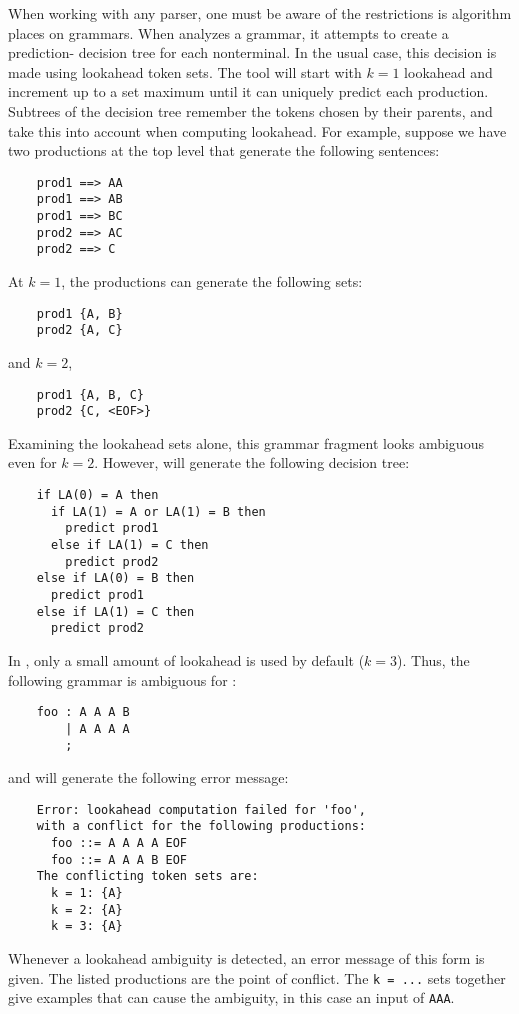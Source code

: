 When working with any parser, one must be aware of the restrictions is algorithm places on grammars.
When \antlr{} analyzes a grammar, it attempts to create a prediction-
decision tree for each nonterminal.  In the usual case, this decision
is made using lookahead token sets.  The tool will start with $k = 1$
lookahead and increment up to a set maximum until it can
uniquely predict each production.  Subtrees of the decision tree
remember the tokens chosen by their parents, and take this into account
when computing lookahead.  For example, suppose we have two productions
at the top level that generate the following sentences:
\begin{verbatim}
    prod1 ==> AA
    prod1 ==> AB
    prod1 ==> BC
    prod2 ==> AC
    prod2 ==> C
\end{verbatim}
At $k = 1$, the productions can generate the following sets:
\begin{verbatim}
    prod1 {A, B}
    prod2 {A, C}
\end{verbatim}
and $k = 2$,
\begin{verbatim}
    prod1 {A, B, C}
    prod2 {C, <EOF>}
\end{verbatim}
Examining the lookahead sets alone, this grammar fragment looks ambiguous
even for $k = 2$.  However, \antlr{} will generate the following decision
tree:
\begin{verbatim}
    if LA(0) = A then
      if LA(1) = A or LA(1) = B then
        predict prod1
      else if LA(1) = C then
        predict prod2
    else if LA(0) = B then
      predict prod1
    else if LA(1) = C then
      predict prod2
\end{verbatim}

In \antlr{}, only a small amount of lookahead is used by default ($k = 3$).  Thus, the following grammar is ambiguous for \antlr{}:
\begin{verbatim}
    foo : A A A B
        | A A A A
        ;
\end{verbatim}
and will generate the following error message:
\begin{verbatim}
    Error: lookahead computation failed for 'foo',
    with a conflict for the following productions:
      foo ::= A A A A EOF
      foo ::= A A A B EOF
    The conflicting token sets are:
      k = 1: {A}
      k = 2: {A}
      k = 3: {A}
\end{verbatim}
Whenever a lookahead ambiguity is detected, an error message of this form is given.  The listed productions are the point of conflict.  The {\tt k = ...} sets together give examples that can cause the ambiguity, in this case an input of {\tt AAA}.

